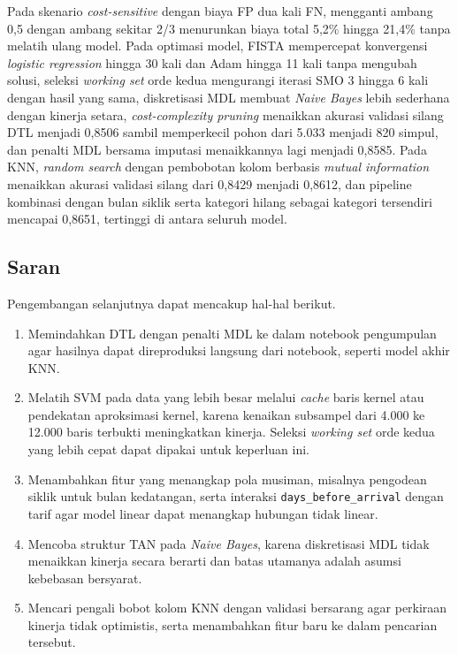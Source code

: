 Pada skenario \textit{cost-sensitive} dengan biaya FP dua kali FN, mengganti ambang 0,5 dengan ambang sekitar 2/3 menurunkan biaya total 5,2\% hingga 21,4\% tanpa melatih ulang model. Pada optimasi model, FISTA mempercepat konvergensi \textit{logistic regression} hingga 30 kali dan Adam hingga 11 kali tanpa mengubah solusi, seleksi \textit{working set} orde kedua mengurangi iterasi SMO 3 hingga 6 kali dengan hasil yang sama, diskretisasi MDL membuat \textit{Naive Bayes} lebih sederhana dengan kinerja setara, \textit{cost-complexity pruning} menaikkan akurasi validasi silang DTL menjadi 0,8506 sambil memperkecil pohon dari 5.033 menjadi 820 simpul, dan penalti MDL bersama imputasi menaikkannya lagi menjadi 0,8585. Pada KNN, \textit{random search} dengan pembobotan kolom berbasis \textit{mutual information} menaikkan akurasi validasi silang dari 0,8429 menjadi 0,8612, dan pipeline kombinasi dengan bulan siklik serta kategori hilang sebagai kategori tersendiri mencapai 0,8651, tertinggi di antara seluruh model.

\subsection{Saran}
Pengembangan selanjutnya dapat mencakup hal-hal berikut.
\begin{enumerate}
    \setlength{\itemsep}{0pt}
    \item Memindahkan DTL dengan penalti MDL ke dalam notebook pengumpulan agar hasilnya dapat direproduksi langsung dari notebook, seperti model akhir KNN.
    \item Melatih SVM pada data yang lebih besar melalui \textit{cache} baris kernel atau pendekatan aproksimasi kernel, karena kenaikan subsampel dari 4.000 ke 12.000 baris terbukti meningkatkan kinerja. Seleksi \textit{working set} orde kedua yang lebih cepat dapat dipakai untuk keperluan ini.
    \item Menambahkan fitur yang menangkap pola musiman, misalnya pengodean siklik untuk bulan kedatangan, serta interaksi \texttt{days\_before\_arrival} dengan tarif agar model linear dapat menangkap hubungan tidak linear.
    \item Mencoba struktur TAN pada \textit{Naive Bayes}, karena diskretisasi MDL tidak menaikkan kinerja secara berarti dan batas utamanya adalah asumsi kebebasan bersyarat.
    \item Mencari pengali bobot kolom KNN dengan validasi bersarang agar perkiraan kinerja tidak optimistis, serta menambahkan fitur baru ke dalam pencarian tersebut.
\end{enumerate}
